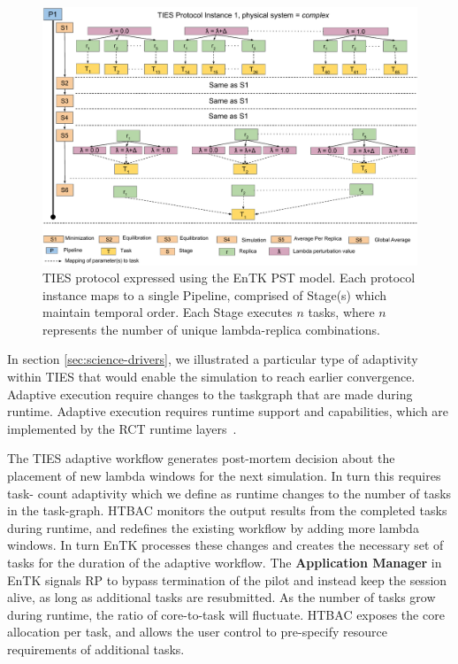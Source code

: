 \begin{figure}
  \centering
   \includegraphics[width=\columnwidth]{figures/_TIES_EnTK_implementation.pdf}
  \caption{TIES protocol expressed using the EnTK PST model. Each protocol 
  instance maps to a single Pipeline, comprised of Stage(s) which maintain 
  temporal order. Each Stage executes $n$ tasks, where $n$ represents the 
  number of unique lambda-replica combinations.}
\label{fig:pst}
\end{figure}

In section \ref{sec:science-drivers}, we illustrated a particular type of
adaptivity within TIES that would enable the simulation to reach earlier
convergence. Adaptive execution require changes to the taskgraph that are made
during runtime. Adaptive execution requires runtime support and capabilities,
which are implemented by the RCT runtime layers~\cite{power-of-many17}.

The TIES adaptive workflow generates post-mortem decision about the placement
of new lambda windows for the next simulation. In turn this requires task-
count adaptivity which we define as runtime changes to the number of tasks in
the task-graph. HTBAC monitors the output results from the completed tasks
during runtime, and redefines the existing workflow by adding more lambda
windows. In turn EnTK processes these changes and creates the necessary set of
tasks for the duration of the adaptive workflow. The \textbf{Application
Manager} in EnTK signals RP to bypass termination of the pilot and instead
keep the session alive, as long as additional tasks are resubmitted. As the
number of tasks grow during runtime, the ratio of core-to-task will fluctuate.
HTBAC exposes the core allocation per task, and allows the user control to
pre-specify resource requirements of additional tasks.

